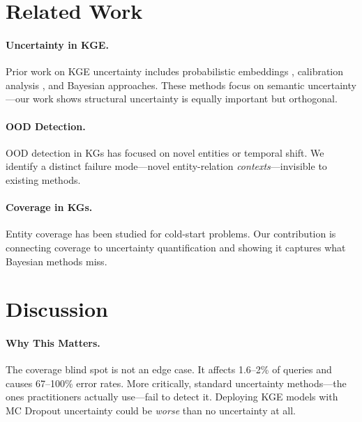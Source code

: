 \documentclass{article}
\begin{document}
\section{Related Work}

\paragraph{Uncertainty in KGE.}
Prior work on KGE uncertainty includes probabilistic embeddings \citep{chen2021beurre}, calibration analysis \citep{safavi2020evaluating}, and Bayesian approaches.
These methods focus on semantic uncertainty---our work shows structural uncertainty is equally important but orthogonal.

\paragraph{OOD Detection.}
OOD detection in KGs has focused on novel entities or temporal shift.
We identify a distinct failure mode---novel entity-relation \emph{contexts}---invisible to existing methods.

\paragraph{Coverage in KGs.}
Entity coverage has been studied for cold-start problems.
Our contribution is connecting coverage to uncertainty quantification and showing it captures what Bayesian methods miss.

\section{Discussion}

\paragraph{Why This Matters.}
The coverage blind spot is not an edge case.
It affects 1.6--2\% of queries and causes 67--100\% error rates.
More critically, standard uncertainty methods---the ones practitioners actually use---fail to detect it.
Deploying KGE models with MC Dropout uncertainty could be \emph{worse} than no uncertainty at all.
\end{document}
